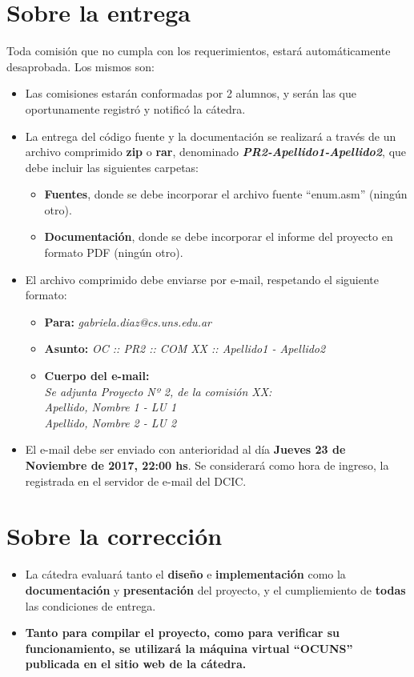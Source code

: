 \documentclass[12pt,a4paper]{article}
\begin{document}
\section*{Sobre la entrega}
Toda comisión que no cumpla con los requerimientos, estará automáticamente desaprobada. Los mismos son:
\begin{itemize}
		
	\item Las comisiones estarán conformadas por 2 alumnos, y serán las que oportunamente registró y notificó la cátedra.
		
	\item La entrega del código fuente y la documentación se realizará a través de un archivo comprimido \textbf{zip} o \textbf{rar}, denominado \textbf{\textit{PR2-Apellido1-Apellido2}}, que debe incluir las siguientes carpetas:
	\begin{itemize}
		\item \textbf{Fuentes}, donde se debe incorporar el archivo fuente “enum.asm” (ningún otro).
		\item \textbf{Documentación}, donde se debe incorporar el informe del proyecto en formato PDF (ningún otro).
	\end{itemize}		
	\item El archivo comprimido debe enviarse por e-mail, respetando el siguiente formato: 
	\begin{itemize}
		\item \textbf{Para:} \textit{gabriela.diaz@cs.uns.edu.ar}
		\item \textbf{Asunto:} \textit{OC :: PR2 :: COM XX :: Apellido1 - Apellido2}
		\item \textbf{Cuerpo del e-mail:} \\
		\textit{Se adjunta Proyecto Nº 2, de la comisión XX: } \\
		\textit{Apellido, Nombre 1 - LU 1} \\
		\textit{Apellido, Nombre 2 - LU 2}
	\end{itemize}
	
	\item El e-mail debe ser enviado con anterioridad al día \textbf{Jueves 23 de Noviembre de 2017, 22:00 hs}. Se considerará como hora de ingreso, la registrada en el servidor de e-mail del DCIC.
		
\end{itemize}

\section*{Sobre la corrección}

\begin{itemize}
	
	\item La cátedra evaluará tanto el \textbf{diseño} e \textbf{implementación}
	como la \textbf{documentación} y \textbf{presentación} del proyecto, y el cumpliemiento de \textbf{todas} las condiciones de entrega.
	
	\item \textbf{Tanto para compilar el proyecto, como para verificar su funcionamiento, se utilizará la máquina virtual “OCUNS” publicada en el sitio web de la cátedra.}
	
\end{itemize}
\end{document}
